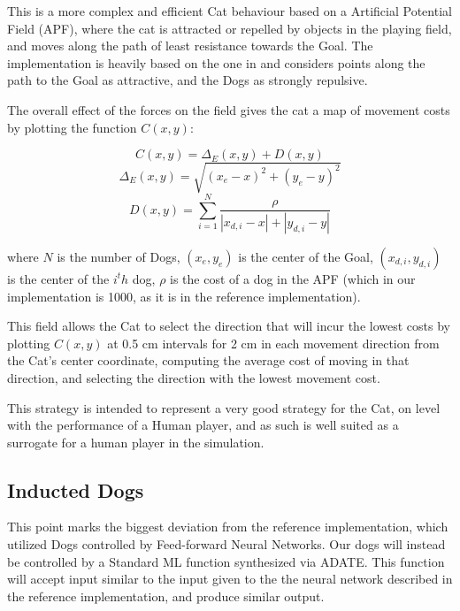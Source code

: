 This is a more complex and efficient Cat behaviour based on a Artificial
Potential Field (APF), where the cat is attracted or repelled by objects in the
playing field, and moves along the path of least resistance towards the Goal.
The implementation is heavily based on the one in
\citet[Chap.~5.1.1.3]{yannakakis2005ai} and considers points along the path to
the Goal as attractive, and the Dogs as strongly repulsive.

The overall effect of the forces on the field gives the cat a map of movement
costs by plotting the function $C(x,y)$:

\begin{equation}
  \label{eq:1}
  C(x,y) = \Delta_E(x,y) + D(x,y)
\end{equation}
\begin{equation}
  \label{eq:2}
  \Delta_E(x,y) = \sqrt{(x_e - x)^2 + (y_e - y)^2}
\end{equation}
\begin{equation}
  \label{eq:3}
  D(x,y) = \sum^N_{i=1} \frac{\rho}{|x_{d,i} - x| + |y_{d,i}-y|}
\end{equation}

where \(N\) is the number of Dogs, \((x_e,y_e)\) is the center of the Goal,
\((x_{d,i},y_{d,i})\) is the center of the \(i^th\) dog, \(\rho\) is the cost of
a dog in the APF (which in our implementation is 1000, as it is in the reference
implementation).

This field allows the Cat to select the direction that will incur the lowest
costs by plotting $C(x,y)$ at 0.5 cm intervals for 2 cm in each movement
direction from the Cat's center coordinate, computing the average cost of moving
in that direction, and selecting the direction with the lowest movement cost.

This strategy is intended to represent a very good strategy for the Cat, on
level with the performance of a Human player, and as such is well suited as a
surrogate for a human player in the simulation.

\subsection{Inducted Dogs}
\label{sec:inducted-dogs}

This point marks the biggest deviation from the reference implementation, which
utilized Dogs controlled by Feed-forward Neural Networks.
\citep[Chap.~5.1.2]{yannakakis2005ai} Our dogs will instead be controlled by a
Standard ML function synthesized via ADATE. This function will accept input
similar to the input given to the the neural network described in the reference
implementation, and produce similar output.

